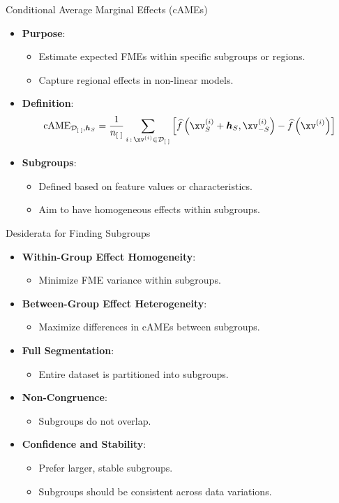 \documentclass[11pt,compress,t,notes=noshow, aspectratio=169, xcolor=table]{beamer}
\newcommand{\boldhS}{\bm{h}_{S}}
\begin{document}
\begin{frame}{Conditional Average Marginal Effects (cAMEs)}
\begin{itemize}
\item \textbf{Purpose}:
\begin{itemize}
\item Estimate expected FMEs within specific subgroups or regions.
\item Capture regional effects in non-linear models.
\end{itemize}
\item \textbf{Definition}:
\[
\text{cAME}_{\mathcal{D}_{[\;]}, \boldhS} = \frac{1}{n_{[\;]}} \sum_{i \,:\, \xv^{(i)} \in \mathcal{D}_{[\;]}} \left[ \widehat{f}\left(\xv_S^{(i)} + \boldhS, \xv_{-S}^{(i)}\right) - \widehat{f}\left(\xv^{(i)}\right) \right]
\]
\item \textbf{Subgroups}:
\begin{itemize}
\item Defined based on feature values or characteristics.
\item Aim to have homogeneous effects within subgroups.
\end{itemize}
\end{itemize}
\end{frame}

\begin{frame}{Desiderata for Finding Subgroups}
\begin{itemize}
\item \textbf{Within-Group Effect Homogeneity}:
\begin{itemize}
\item Minimize FME variance within subgroups.
\end{itemize}
\item \textbf{Between-Group Effect Heterogeneity}:
\begin{itemize}
\item Maximize differences in cAMEs between subgroups.
\end{itemize}
\item \textbf{Full Segmentation}:
\begin{itemize}
\item Entire dataset is partitioned into subgroups.
\end{itemize}
\item \textbf{Non-Congruence}:
\begin{itemize}
\item Subgroups do not overlap.
\end{itemize}
\item \textbf{Confidence and Stability}:
\begin{itemize}
\item Prefer larger, stable subgroups.
\item Subgroups should be consistent across data variations.
\end{itemize}
\end{itemize}
\end{frame}
\end{document}
